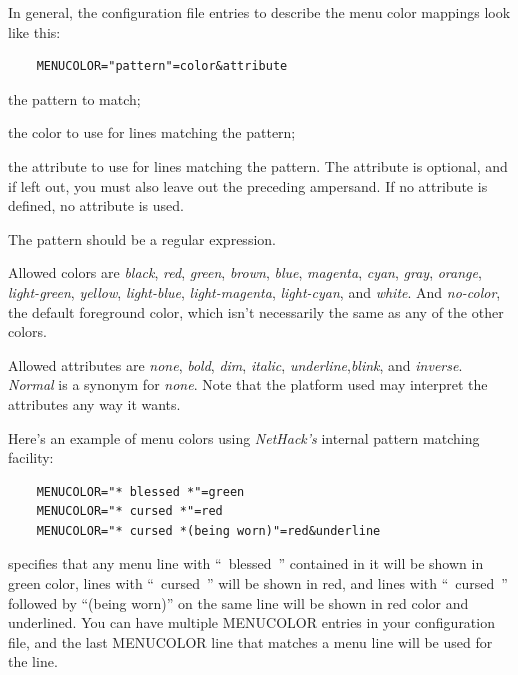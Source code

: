 \documentclass[titlepage]{article}
\begin{document}
In general, the configuration file entries to describe the menu color mappings
look like this:
\begin{verbatim}
    MENUCOLOR="pattern"=color&attribute
\end{verbatim}

\begin{description}[font=\mdseries\itshape]
\item[pattern]
the pattern to match;
\item[color]
the color to use for lines matching the pattern;
\item[attribute]
the attribute to use for lines matching the pattern. The attribute is
optional, and if left out, you must also leave out the preceding ampersand.
If no attribute is defined, no attribute is used.
\end{description}

The pattern should be a regular expression.

Allowed colors are \textit{black}, \textit{red}, \textit{green}, \textit{brown},
\textit{blue}, \textit{magenta}, \textit{cyan}, \textit{gray}, \textit{orange},
\textit{light-green}, \textit{yellow}, \textit{light-blue}, \textit{light-magenta},
\textit{light-cyan}, and \textit{white}.
And \textit{no-color}, the default foreground color, which isn't necessarily
the same as any of the other colors.

Allowed attributes are \textit{none}, \textit{bold}, \textit{dim}, \textit{italic},
\textit{underline},\textit{blink}, and \textit{inverse}.
\textit{Normal} is a synonym for \textit{none}.
Note that the platform used may interpret the attributes any way it
wants.

Here's an example of menu colors using \textit{NetHack's} internal
pattern matching facility:

\begin{verbatim}
    MENUCOLOR="* blessed *"=green
    MENUCOLOR="* cursed *"=red
    MENUCOLOR="* cursed *(being worn)"=red&underline
\end{verbatim}

specifies that any menu line with ``~blessed~'' contained
in it will be shown in green color, lines with ``~cursed~'' will be
shown in red, and lines with ``~cursed~'' followed by ``(being worn)''
on the same line will be shown in red color and underlined.
You can have multiple MENUCOLOR entries in your configuration file,
and the last MENUCOLOR line that matches
a menu line will be used for the line.
\end{document}
